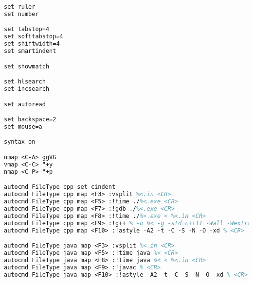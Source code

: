 \begin{lstlisting}[language=tex,identifierstyle=\color{black},commentstyle=\color{black}]
set ruler
set number

set tabstop=4
set softtabstop=4
set shiftwidth=4
set smartindent

set showmatch

set hlsearch
set incsearch

set autoread

set backspace=2
set mouse=a

syntax on

nmap <C-A> ggVG
vmap <C-C> "+y
nmap <C-P> "+p

autocmd FileType cpp set cindent
autocmd FileType cpp map <F3> :vsplit %<.in <CR>
autocmd FileType cpp map <F5> :!time ./%<.exe <CR>
autocmd FileType cpp map <F7> :!gdb ./%<.exe <CR>
autocmd FileType cpp map <F8> :!time ./%<.exe < %<.in <CR>
autocmd FileType cpp map <F9> :!g++ % -o %< -g -std=c++11 -Wall -Wextra -Wconversion && size %<.exe <CR>
autocmd FileType cpp map <F10> :!astyle -A2 -t -C -S -N -O -xd % <CR>

autocmd FileType java map <F3> :vsplit %<.in <CR>
autocmd FileType java map <F5> :!time java %< <CR>
autocmd FileType java map <F8> :!time java %< < %<.in <CR>
autocmd FileType java map <F9> :!javac % <CR>
autocmd FileType java map <F10> :!astyle -A2 -t -C -S -N -O -xd % <CR>
\end{lstlisting}
